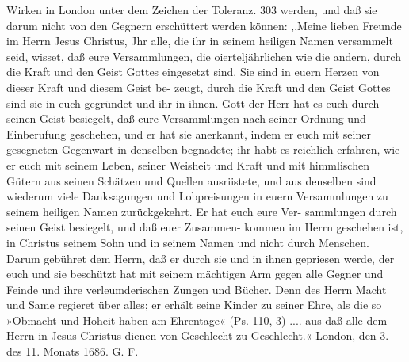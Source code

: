 Wirken in London unter dem Zeichen der Toleranz. 303
werden, und daß sie darum nicht von den Gegnern erschüttert
werden können:
,,Meine lieben Freunde im Herrn Jesus Christus,
Jhr alle, die ihr in seinem heiligen Namen versammelt seid,
wisset, daß eure Versammlungen, die oierteljährlichen wie die
andern, durch die Kraft und den Geist Gottes eingesetzt sind.
Sie sind in euern Herzen von dieser Kraft und diesem Geist be-
zeugt, durch die Kraft und den Geist Gottes sind sie in euch gegründet
und ihr in ihnen. Gott der Herr hat es euch durch seinen Geist
besiegelt, daß eure Versammlungen nach seiner Ordnung und
Einberufung geschehen, und er hat sie anerkannt, indem er euch
mit seiner gesegneten Gegenwart in denselben begnadete; ihr
habt es reichlich erfahren, wie er euch mit seinem Leben, seiner
Weisheit und Kraft und mit himmlischen Gütern aus seinen
Schätzen und Quellen ausriistete, und aus denselben sind wiederum
viele Danksagungen und Lobpreisungen in euern Versammlungen
zu seinem heiligen Namen zurückgekehrt. Er hat euch eure Ver-
sammlungen durch seinen Geist besiegelt, und daß euer Zusammen-
kommen im Herrn geschehen ist, in Christus seinem Sohn und in
seinem Namen und nicht durch Menschen. Darum gebühret dem
Herrn, daß er durch sie und in ihnen gepriesen werde, der euch
und sie beschützt hat mit seinem mächtigen Arm gegen alle Gegner
und Feinde und ihre verleumderischen Zungen und Bücher. Denn
des Herrn Macht und Same regieret über alles; er erhält seine
Kinder zu seiner Ehre, als die so »Obmacht und Hoheit haben
am Ehrentage« (Ps. 110, 3) .... aus daß alle dem Herrn in
Jesus Christus dienen von Geschlecht zu Geschlecht.«
London, den 3. des 11. Monats 1686. G. F.
